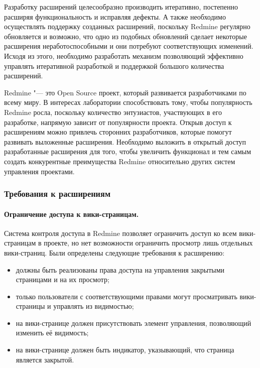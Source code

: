 Разработку расширений целесообразно производить итеративно, постепенно расширяя
функциональность и исправляя дефекты. А также необходимо осуществлять поддержку
созданных расширений, поскольку Redmine регулярно обновляется и возможно, что
одно из подобных обновлений сделает некоторые расширения неработоспособными и
они потребуют соответствующих изменений. Исходя из этого, необходимо
разработать механизм позволяющий эффективно управлять итеративной разработкой и
поддержкой большого количества расширений.

Redmine "--- это Open Source проект, который развивается разработчиками по
всему миру. В интересах лаборатории способствовать тому, чтобы популярность
Redmine росла, поскольку количество энтузиастов, участвующих в его разработке,
напрямую зависит от популярности проекта. Открыв доступ к расширениям можно
привлечь сторонних разработчиков, которые помогут развивать выложенные
расширения. Необходимо выложить в открытый доступ разработанные расширения для
того, чтобы увеличить функционал и тем самым создать конкурентные преимущества
Redmine относительно других систем управления проектами.

\subsubsection{Требования к расширениям}

\paragraph{Ограничение доступа к вики-страницам.}
\label{definition:private_wiki}
Система контроля доступа в Redmine позволяет ограничить доступ ко всем
вики-страницам в проекте, но нет возможности ограничить просмотр лишь отдельных
вики-страниц. Были определены следующие требования к расширению:
\begin{itemize}
  \item должны быть реализованы права доступа на управления закрытыми
  страницами и на их просмотр;
  \item только пользователи с соответствующими правами могут просматривать
  вики-страницы и управлять из видимостью;   
  \item на вики-странице должен присутствовать элемент управления, позволяющий
  изменить её видимость;
  \item на вики-странице должен быть индикатор, указывающий, что страница
  является закрытой.
\end{itemize}

